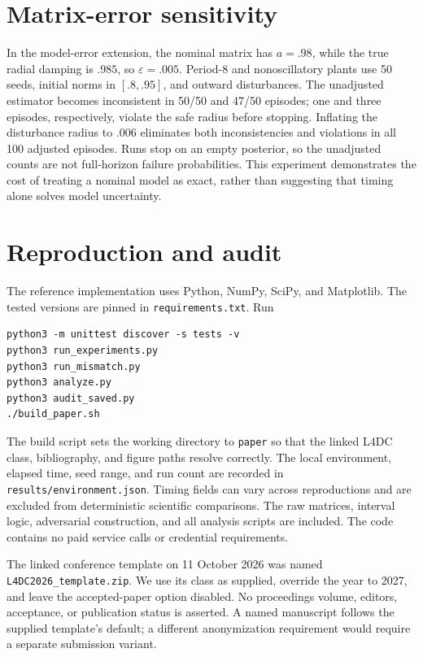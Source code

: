 \documentclass{l4dc2026}
\begin{document}
\section{Matrix-error sensitivity}\label{app:mismatch}
In the model-error extension, the nominal matrix has $a=.98$, while the true radial damping is $.985$, so $\varepsilon=.005$. Period-8 and nonoscillatory plants use 50 seeds, initial norms in $[.8,.95]$, and outward disturbances. The unadjusted estimator becomes inconsistent in 50/50 and 47/50 episodes; one and three episodes, respectively, violate the safe radius before stopping. Inflating the disturbance radius to $.006$ eliminates both inconsistencies and violations in all 100 adjusted episodes. Runs stop on an empty posterior, so the unadjusted counts are not full-horizon failure probabilities. This experiment demonstrates the cost of treating a nominal model as exact, rather than suggesting that timing alone solves model uncertainty.


\section{Reproduction and audit}\label{app:reproduce}
The reference implementation uses Python, NumPy, SciPy, and Matplotlib. The tested versions are pinned in \texttt{requirements.txt}. Run
\begin{verbatim}
python3 -m unittest discover -s tests -v
python3 run_experiments.py
python3 run_mismatch.py
python3 analyze.py
python3 audit_saved.py
./build_paper.sh
\end{verbatim}
The build script sets the working directory to \texttt{paper} so that the linked L4DC class, bibliography, and figure paths resolve correctly. The local environment, elapsed time, seed range, and run count are recorded in \texttt{results/environment.json}. Timing fields can vary across reproductions and are excluded from deterministic scientific comparisons. The raw matrices, interval logic, adversarial construction, and all analysis scripts are included. The code contains no paid service calls or credential requirements.

The linked conference template on 11 October 2026 was named \texttt{L4DC2026\_template.zip}. We use its class as supplied, override the year to 2027, and leave the accepted-paper option disabled. No proceedings volume, editors, acceptance, or publication status is asserted. A named manuscript follows the supplied template's default; a different anonymization requirement would require a separate submission variant.
\end{document}

